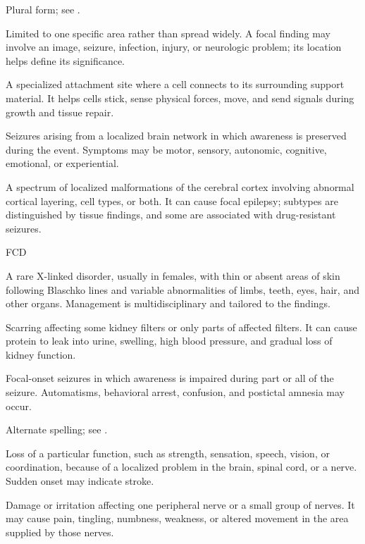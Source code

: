  Plural form; see .

 Limited to one specific area rather than spread widely. A focal finding may involve an image, seizure, infection, injury, or neurologic problem; its location helps define its significance.

 A specialized attachment site where a cell connects to its surrounding support material. It helps cells stick, sense physical forces, move, and send signals during growth and tissue repair.

 Seizures arising from a localized brain network in which awareness is preserved during the event. Symptoms may be motor, sensory, autonomic, cognitive, emotional, or experiential.

 A spectrum of localized malformations of the cerebral cortex involving abnormal cortical layering, cell types, or both. It can cause focal epilepsy; subtypes are distinguished by tissue findings, and some are associated with drug-resistant seizures.

\synonyms
FCD

 A rare X-linked disorder, usually in females, with thin or absent areas of skin following Blaschko lines and variable abnormalities of limbs, teeth, eyes, hair, and other organs. Management is multidisciplinary and tailored to the findings.

 Scarring affecting some kidney filters or only parts of affected filters. It can cause protein to leak into urine, swelling, high blood pressure, and gradual loss of kidney function.

 Focal-onset seizures in which awareness is impaired during part or all of the seizure. Automatisms, behavioral arrest, confusion, and postictal amnesia may occur.

 Alternate spelling; see .

 Loss of a particular function, such as strength, sensation, speech, vision, or coordination, because of a localized problem in the brain, spinal cord, or a nerve. Sudden onset may indicate stroke.

 Damage or irritation affecting one peripheral nerve or a small group of nerves. It may cause pain, tingling, numbness, weakness, or altered movement in the area supplied by those nerves.

